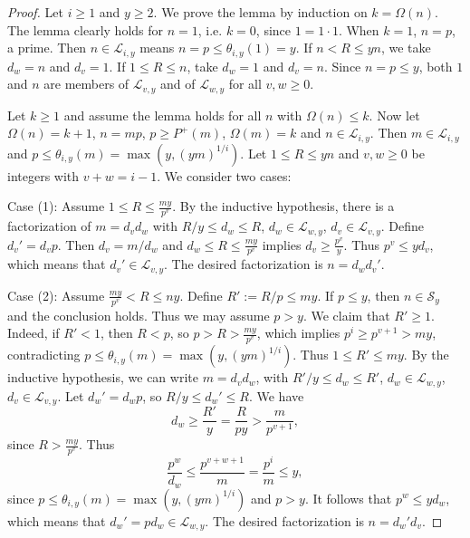 \documentclass[11pt]{amsart}
\begin{document}
\begin{proof}
Let $i\ge 1$ and $y\ge 2$. We prove the lemma by induction on $k=\Omega(n)$. The lemma clearly holds for $n=1$, i.e. $k=0$, since $1=1\cdot 1$. 
When $k=1$, $n=p$, a prime. Then $n\in \mathcal{L}_{i,y}$ means $n=p \le \theta_{i,y}(1)=y$. 
If $n<R\le yn$, we take $d_w=n$ and $d_v=1$. If $1\le R \le n$, take $d_w=1$ and $d_v=n$. 
Since $n=p\le y$, both $1$ and $n$ are members of $\mathcal{L}_{v,y}$ and of $\mathcal{L}_{w,y}$ for all $v,w\ge 0$. 

Let $k\ge 1$ and assume the lemma holds for all $n$ with $\Omega(n)\le k$. 
Now let $\Omega(n)=k+1$, $n=mp$, $p\ge P^+(m)$, $\Omega(m)=k$ and $n\in  \mathcal{L}_{i,y}$.
Then $m\in  \mathcal{L}_{i,y}$ and $p \le \theta_{i,y}(m)=\max(y,(ym)^{1/i})$. 
Let $1\le R \le yn$ and  $v,w \ge 0$ be integers with $v+w=i-1$. We consider two cases:

Case (1): Assume $1\le R \le \frac{my}{p^v}$. By the inductive hypothesis, there is a factorization of $m=d_v d_w$ with $R/y \le d_w \le R$,
$d_w  \in \mathcal{L}_{w,y}$, $d_v \in \mathcal{L}_{v,y}$. Define $d_v'=d_v p$. Then $d_v=m/d_w$ and $d_w\le R \le \frac{my}{p^v}$ implies 
$d_v \ge \frac{p^v}{y}$. Thus $p^v \le y d_v$, which means that $d_v' \in \mathcal{L}_{v,y}$. The desired factorization is $n=d_w d_v'$. 

Case (2): Assume $ \frac{my}{p^v}< R \le ny$. Define $R':=R/p \le my$. If $p\le y$, then $n\in \mathcal{S}_y$ and the conclusion holds. Thus we may assume $p>y$. 
We claim that $R'\ge 1$. 
Indeed, if $R'<1$, then $R<p$, so $p>R>\frac{my}{p^v}$, which implies $p^i \ge p^{v+1} >my$, contradicting $p \le \theta_{i,y}(m)=\max(y,(ym)^{1/i})$.
Thus $1\le R' \le my$. By the inductive hypothesis, we can write $m=d_v d_w$, with $R'/y \le d_w \le R'$,
$d_w  \in \mathcal{L}_{w,y}$, $d_v \in \mathcal{L}_{v,y}$. Let $d_w'=d_w p$, so $R/y \le d_w' \le R$. We have
$$
d_w \ge \frac{R'}{y}= \frac{R}{py} > \frac{m}{p^{v+1}},
$$
since $R>\frac{my}{p^v}$. Thus
$$
\frac{p^w}{d_w} \le \frac{p^{v+w+1}}{m} = \frac{p^i}{m} \le y,
$$
since $p \le \theta_{i,y}(m)=\max(y,(ym)^{1/i})$ and $p>y$. It follows that $p^w \le y d_w$, which means that $d_w'=p d_w \in \mathcal{L}_{w,y}$. 
The desired factorization is $n=d_w' d_v$. 
\end{proof}
\end{document}
